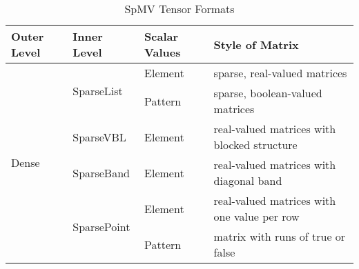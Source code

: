   \begin{table}[htbp]
      \scriptsize
      \centering
      \vspace{-12pt}
      \caption{SpMV Tensor Formats}
      \vspace{-12pt}
      \label{spmv_tensor_formats}
      \begin{tabular}{|l|l|l|l|}
          \hline
          \textbf{Outer Level} & \textbf{Inner Level} & \textbf{Scalar Values} & \textbf{Style of Matrix}\\
          \hline
          \multirow{6}{*}{Dense} & \multirow{2}{*}{SparseList} & Element & sparse, real-valued matrices \\
          \cline{3-4} 
          & & Pattern & sparse, boolean-valued matrices \\
          \cline{2-4} 
          & SparseVBL & Element & real-valued matrices with blocked structure \\
          \cline{2-4}
          & SparseBand & Element & real-valued matrices with diagonal band \\
          \cline{2-4}
          & \multirow{2}{*}{SparsePoint} & Element & real-valued matrices with one value per row \\
          \cline{3-4} 
          & & Pattern & matrix with runs of true or false \\
          \hline 
      \end{tabular}
      \vspace{-8pt}
  \end{table}
  
  
